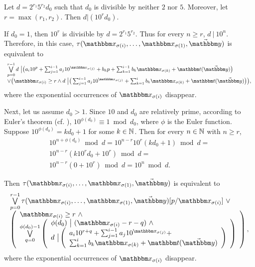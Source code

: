 Let $d = 2^{r_1} 5^{r_2}  d_0$ such that $d_0$ is divisible by neither $2$ nor $5$. Moreover, let $r = \max(r_1, r_2)$. Then $d | (10^rd_0)$. 

If $d_0 = 1$, then $10^r$ is divisible by $d = 2^{r_1}5^{r_2}$. Thus for every $n \ge r$, $d \ |\ 10^n$.  Therefore, in this case, $\tau(\ivarx_{\sigma(i)}, \ldots, \ivarx_{\sigma(1)}, \vec{\ivary})$ is equivalent to 
\[
\small
\begin{array}{l}
\bigvee \limits_{p = 0}^{r - 1} d\ \big | \big(a_i 10^{p} + \sum_{j=1}^{i-1} a_j 10^{\ivarx_{\sigma(j)}} + b_kp + \sum_{k=1}^{i-1} b_k \ivarx_{\sigma(k)} 
+ \iterm(\vec{\ivary}) \big)\\
%
\vee \big(\ivarx_{\sigma(i)} \ge r \wedge d\ \big | \big(\sum_{j=1}^{i-1} a_j 10^{\ivarx_{\sigma(j)}} + \sum_{k=1}^{i} b_k \ivarx_{\sigma(k)} 
+ \iterm(\vec{\ivary}) \big)\big),
\end{array}
\]
where the exponential occurrences of $\ivarx_{\sigma(i)}$ disappear.

Next, let us assume $d_0 > 1$. Since $10$ and $d_0$ are relatively prime, according to Euler's theorem (cf. \cite{HW80}), $10^{\phi(d_0)} \equiv 1 \bmod d_0$, where $\phi$ is the Euler function. Suppose $10^{\phi(d_0)} = kd_0 + 1$ for some $k \in \mathbb{N}$. 
Then for every $n \in \mathbb{N}$ with $n \ge r$, 
$$
\begin{array}{l}
10^{n + \phi(d_0)} \bmod d =10^{n-r} 10^r (kd_0 + 1) \bmod d = \\
10^{n-r} (k 10^rd_0 + 10^r) \bmod d = \\
10^{n-r} (0+10^r) \bmod d = 10^n \bmod d.
\end{array}
$$

Then $\tau(\ivarx_{\sigma(i)}, \ldots, \ivarx_{\sigma(1)}, \vec{\ivary})$ is equivalent to 
\[
\begin{array}{l}
\bigvee \limits_{p=0}^{r-1} \tau(\ivarx_{\sigma(i)}, \ldots, \ivarx_{\sigma(1)}, \vec{\ivary})[p/\ivarx_{\sigma(i)}]\ \vee \\
\left(
\begin{array}{l}
\ivarx_{\sigma(i)} \ge r\ \wedge \\
\bigvee \limits_{q = 0}^{\phi(d_0)-1} 
\left(
\begin{array}{l}
\phi(d_0)\ \big |\ (\ivarx_{\sigma(i)} - r - q)\ \wedge \\
d\ \big | 
\left(
\begin{array}{l}
a_i 10^{r+q} + \sum_{j=1}^{i-1} a_j 10^{\ivarx_{\sigma(j)}} + \\
\sum_{k=1}^{i} b_k \ivarx_{\sigma(k)} + \iterm(\vec{\ivary})
\end{array}
\right) 
\end{array}
\right)
\end{array}
\right),
\end{array}
\]
where the exponential occurrences of $\ivarx_{\sigma(i)}$ disappear.

